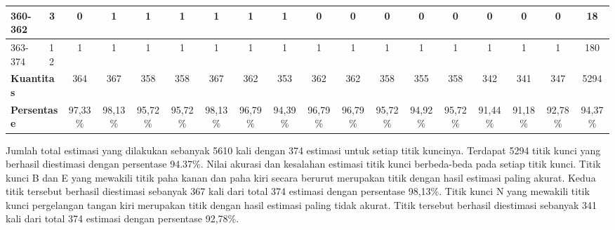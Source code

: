 \begin{table}[htbp]
\begin{center}
{\begin{tabular}{|l|l|c|c|c|c|c|c|c|c|c|c|c|c|c|c|c|c|}
                360-362                                   & 3                                               & 0          & 1          & 1          & 1          & 1          & 1          & 1          & 0          & 0          & 0          & 0          & 0          & 0          & 0          & 0          & 18           \\ \hline
                363-374                                   & 12                                              & 1          & 1          & 1          & 1          & 1          & 1          & 1          & 1          & 1          & 1          & 1          & 1          & 1          & 1          & 1          & 180          \\ \hline
                \hline
                \multicolumn{2}{|l|}{\textbf{Kuantitas}}  & 364                                             & 367        & 358        & 358        & 367        & 362        & 353        & 362        & 362        & 358        & 355        & 358        & 342        & 341        & 347        & 5294                      \\ \hline
                \multicolumn{2}{|l|}{\textbf{Persentase}} & 97,33\%                                         & 98,13\%    & 95,72\%    & 95,72\%    & 98,13\%    & 96,79\%    & 94,39\%    & 96,79\%    & 96,79\%    & 95,72\%    & 94,92\%    & 95,72\%    & 91,44\%    & 91,18\%    & 92,78\%    & 94,37\%                   \\\hline %
            \end{tabular}}
    \end{center}
\end{table}

Jumlah total estimasi yang dilakukan sebanyak 5610 kali dengan 374 estimasi untuk setiap titik kuncinya.
Terdapat 5294 titik kunci yang berhasil diestimasi dengan persentase 94.37\%.
Nilai akurasi dan kesalahan estimasi titik kunci berbeda-beda pada setiap titik kunci.
Titik kunci B dan E yang mewakili titik paha kanan dan paha kiri secara berurut merupakan
titik dengan hasil estimasi paling akurat. Kedua titik tersebut berhasil diestimasi sebanyak
367 kali dari total 374 estimasi dengan persentase 98,13\%.
Titik kunci N yang mewakili titik kunci pergelangan tangan kiri merupakan titik dengan hasil estimasi
paling tidak akurat. Titik tersebut berhasil diestimasi sebanyak 341 kali dari total
374 estimasi dengan persentase 92,78\%.